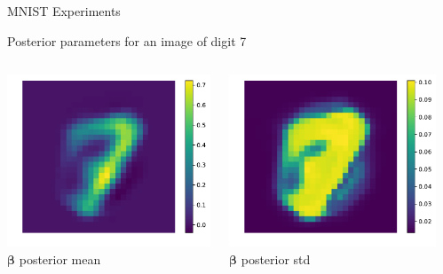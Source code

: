 \documentclass[9pt]{beamer}
\begin{document}
\begin{frame}{MNIST Experiments}
\begin{block}{Posterior parameters for an image of digit 7}
\begin{columns}
      \begin{column}{0.33\textwidth}
        \centering
        \includegraphics[width=0.75\columnwidth]{graphics/posterior_mean} \\
        \(\boldsymbol\beta \) posterior mean
      \end{column}
      \begin{column}{0.33\textwidth}
        \centering
        \includegraphics[width=0.75\columnwidth]{graphics/posterior_std}\\
        \(\boldsymbol\beta \) posterior std
      \end{column}
      \begin{column}{0.33\textwidth}
        \centering

\end{column}
\end{columns}
\end{block}
\end{frame}
\end{document}
